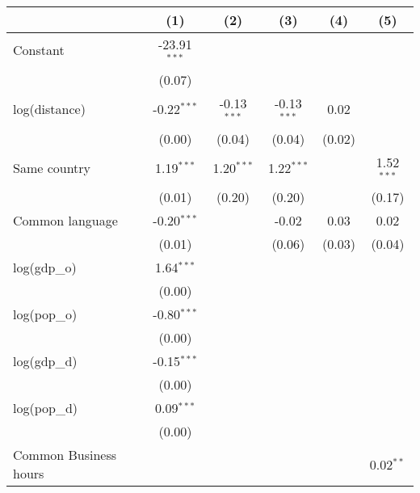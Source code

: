 
\begingroup
\centering
\small
\begin{tabular}{lccccc}
   \toprule
                               & (1)            & (2)           & (3)           & (4)       & (5)\\  
   \midrule 
   Constant                    & -23.91$^{***}$ &               &               &           &   \\   
                               & (0.07)         &               &               &           &   \\   
   log(distance)               & -0.22$^{***}$  & -0.13$^{***}$ & -0.13$^{***}$ & 0.02      &   \\   
                               & (0.00)         & (0.04)        & (0.04)        & (0.02)    &   \\   
   Same country                & 1.19$^{***}$   & 1.20$^{***}$  & 1.22$^{***}$  &           & 1.52$^{***}$\\   
                               & (0.01)         & (0.20)        & (0.20)        &           & (0.17)\\   
   Common language             & -0.20$^{***}$  &               & -0.02         & 0.03      & 0.02\\   
                               & (0.01)         &               & (0.06)        & (0.03)    & (0.04)\\   
   log(gdp\_o)                 & 1.64$^{***}$   &               &               &           &   \\   
                               & (0.00)         &               &               &           &   \\   
   log(pop\_o)                 & -0.80$^{***}$  &               &               &           &   \\   
                               & (0.00)         &               &               &           &   \\   
   log(gdp\_d)                 & -0.15$^{***}$  &               &               &           &   \\   
                               & (0.00)         &               &               &           &   \\   
   log(pop\_d)                 & 0.09$^{***}$   &               &               &           &   \\   
                               & (0.00)         &               &               &           &   \\   
   Common Business hours       &                &               &               &           & 0.02$^{**}$\\   

\end{tabular}
